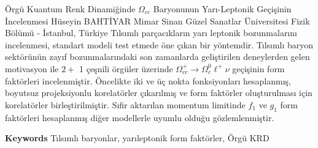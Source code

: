 
    \begin{abstract_online}{Örgü Kuantum Renk Dinamiğinde $\Omega_{c c}$ Baryonunun Yarı-Leptonik Geçişinin İncelenmesi}{%
        Hüseyin BAHTİYAR}{%
        }{%
        Mimar Sinan Güzel Sanatlar Üniversitesi Fizik Bölümü - İstanbul, Türkiye}
    Tılsımlı parçacıkların yarı leptonik bozunmalarını incelenmesi, standart modeli test etmede öne çıkan bir yöntemdir. Tılsımlı baryon sektörünün zayıf bozunmalarındaki son zamanlarda geliştirilen deneylerden gelen motivasyon ile $2+$ 1 çeşnili örgüler üzerinde $\Omega_{c c}^{+} \rightarrow \Omega_{c}^{0} \ell^{+} \nu$ geçişinin form faktörleri incelenmiştir. Öncelikte iki ve üç nokta fonksiyonları hesaplanmış, boyutsuz projeksiyonlu korelatörler çıkarılmış ve form faktörler oluşturulması için korelatörler birleştirilmiştir. Sıfir aktarılan momentum limitinde $f_{1}$ ve $g_{1}$ form faktörleri hesaplanmış diğer modellerle uyumlu olduğu gözlemlenmiştir. 
    
        \textbf{Keywords} \newline{}Tılsımlı baryonlar, yarıleptonik form faktörler, Örgü KRD
    \end{abstract_online}
    